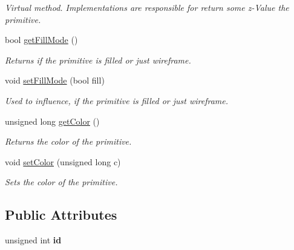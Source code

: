 \begin{DoxyCompactItemize}
\begin{DoxyCompactList}\small\item\em Virtual method. Implementations are responsible for return some z-\/Value the primitive. \item\end{DoxyCompactList}\item 
\hypertarget{class_s3_d_primitive_a36948fee7526b4c0634d16372ebb3e56}{
bool \hyperlink{class_s3_d_primitive_a36948fee7526b4c0634d16372ebb3e56}{getFillMode} ()}
\label{class_s3_d_primitive_a36948fee7526b4c0634d16372ebb3e56}

\begin{DoxyCompactList}\small\item\em Returns if the primitive is filled or just wireframe. \item\end{DoxyCompactList}\item 
void \hyperlink{class_s3_d_primitive_afd54077b1dbe256b9c6dfe67da7b0a0b}{setFillMode} (bool fill)
\begin{DoxyCompactList}\small\item\em Used to influence, if the primitive is filled or just wireframe. \item\end{DoxyCompactList}\item 
\hypertarget{class_s3_d_primitive_a4102845e7754e44c51a87c0fcb391c73}{
unsigned long \hyperlink{class_s3_d_primitive_a4102845e7754e44c51a87c0fcb391c73}{getColor} ()}
\label{class_s3_d_primitive_a4102845e7754e44c51a87c0fcb391c73}

\begin{DoxyCompactList}\small\item\em Returns the color of the primitive. \item\end{DoxyCompactList}\item 
void \hyperlink{class_s3_d_primitive_a1c8f036193987522bdfb6a49b9b74000}{setColor} (unsigned long c)
\begin{DoxyCompactList}\small\item\em Sets the color of the primitive. \item\end{DoxyCompactList}\end{DoxyCompactItemize}
\subsection*{Public Attributes}
\begin{DoxyCompactItemize}
\item 
\hypertarget{class_s3_d_primitive_ae8ff735495c481dbbd0c99ffe16d954f}{
unsigned int {\bfseries id}}
\label{class_s3_d_primitive_ae8ff735495c481dbbd0c99ffe16d954f}

\end{DoxyCompactItemize}
